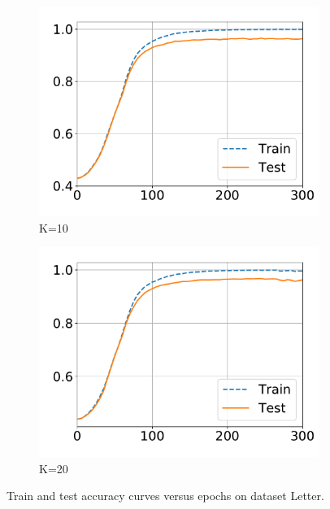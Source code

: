 \begin{figure}[!tp]
\begin{subfigure}{0.31\textwidth}
  \end{subfigure}
  \centering
  \begin{subfigure}{.31\textwidth}
    \centering
    \includegraphics[width=1\linewidth]{images/supply/train_curves/letter_10.pdf}
    \vspace{-0.8cm}
    \caption{K=10}
  \end{subfigure}
  \centering
  \begin{subfigure}{.31\textwidth}
    \centering
    \includegraphics[width=1\linewidth]{images/supply/train_curves/letter_20.pdf}
    \vspace{-0.8cm}
    \caption{K=20}
  \end{subfigure}
  \caption{Train and test accuracy curves versus epochs on dataset Letter.}
  \label{fig:class-letter}
\end{figure}




